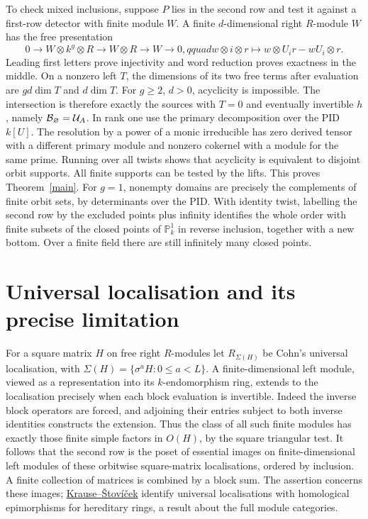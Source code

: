 \documentclass[11pt]{article}
\begin{document}
To check mixed inclusions, suppose $P$ lies in the second row and test
it against a first-row detector with finite module $W$. A finite
$d$-dimensional right $R$-module $W$ has the free presentation
\[
 0\longrightarrow W\otimes k^g\otimes R\longrightarrow W\otimes R
 \longrightarrow W\longrightarrow0,qquad
 w\otimes i\otimes r\longmapsto w\otimes U_i r-wU_i\otimes r .
\]
Leading first letters prove injectivity and word reduction proves
exactness in the middle. On a nonzero left $T$, the dimensions of its
two free terms after evaluation are $gd\dim T$ and $d\dim T$. For
$g\ge2$, $d>0$, acyclicity is impossible. The intersection is therefore
exactly the sources with $T=0$ and eventually invertible $h$, namely
$\mathcal B_\varnothing=\mathcal U_A$. In rank one use the primary decomposition
over the PID $k[U]$. The resolution by a power of a monic irreducible
has zero derived tensor with a different primary module and nonzero
cokernel with a module for the same prime. Running over all twists
shows that acyclicity is equivalent to disjoint orbit supports. All
finite supports can be tested by the lifts. This proves
Theorem~\ref{main}. For $g=1$, nonempty domains are precisely the
complements of finite orbit sets, by determinants over the PID. With
identity twist, labelling the second row by the excluded points plus
infinity identifies the whole order with finite subsets of the closed
points of $\mathbb P^1_k$ in reverse inclusion, together with a new
bottom. Over a finite field there are still infinitely many closed points.

\section{Universal localisation and its precise limitation}
For a square matrix $H$ on free right $R$-modules let $R_{\Sigma(H)}$
be Cohn's universal localisation, with
$\Sigma(H)=\{\sigma^a H:0\le a<L\}$. A finite-dimensional left module,
viewed as a representation into its $k$-endomorphism ring, extends to
the localisation precisely when each block evaluation is invertible.
Indeed the inverse block operators are forced, and adjoining their
entries subject to both inverse identities constructs the extension.
Thus the class of all such finite modules has exactly those finite
simple factors in $O(H)$, by the square triangular test. It follows
that the second row is the poset of essential images on
finite-dimensional left modules of these orbitwise square-matrix
localisations, ordered by inclusion. A finite collection of matrices
is combined by a block sum. The assertion concerns these images;
\href{https://arxiv.org/abs/0810.1401}{Krause--\v Stov\'i\v cek}
identify universal localisations with homological epimorphisms for
hereditary rings, a result about the full module categories.
\end{document}
